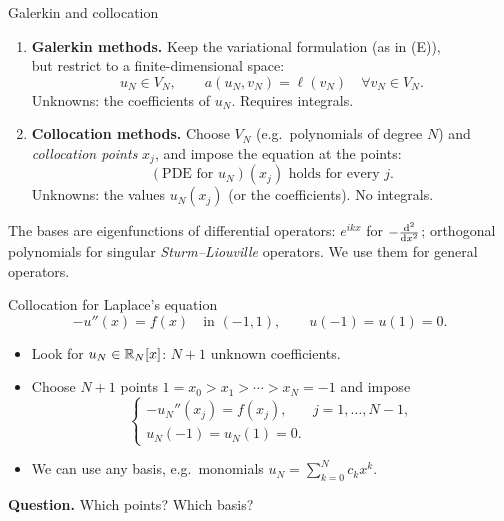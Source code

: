 \begin{frame}{Galerkin and collocation}
    \begin{enumerate}
        \item \textbf{Galerkin methods.} Keep the variational formulation (as in (E)),\\ but restrict to a finite-dimensional space:
              \[
                  u_N \in V_N, \qquad a(u_N, v_N) = \ell(v_N) \quad \forall v_N \in V_N.
              \]
              Unknowns: the \alert{coefficients} of $u_N$. Requires integrals.
        \item \textbf{Collocation methods.} Choose $V_N$ (e.g.\ polynomials of degree $N$) and \emph{collocation points} $x_j$, and impose the equation \alert{at the points}:
              \[
                  (\text{PDE for } u_N)(x_j) \text{ holds for every } j.
              \]
              Unknowns: the values $u_N(x_j)$ (or the coefficients). No integrals.
    \end{enumerate}
    \begin{remark}
        The bases are eigenfunctions of differential operators: $e^{ikx}$ for $-\frac{{\mathrm d}^2}{{\mathrm d} x^2}$; orthogonal polynomials for singular \emph{Sturm--Liouville} operators. We use them for general operators.
    \end{remark}
\end{frame}

\begin{frame}{Collocation for Laplace's equation}
    \[
        -u''(x) = f(x) \quad \text{in } (-1,1), \qquad u(-1) = u(1) = 0.
    \]
    \begin{itemize}
        \item Look for $u_N \in {\mathbb R}_N[x]$: $N+1$ unknown coefficients.
        \item Choose $N+1$ points $1 = x_0 > x_1 > \cdots > x_N = -1$ and impose
              \[
                  \begin{cases}
                      -u_N''(x_j) = f(x_j), & j = 1, \dots, N-1, \\
                      u_N(-1) = u_N(1) = 0.
                  \end{cases}
              \]
        \item We can use any basis, e.g.\ monomials $u_N = \sum_{k=0}^N c_k x^k$.
    \end{itemize}
    \bigskip
    \textbf{Question.} Which points? Which basis?
\end{frame}

